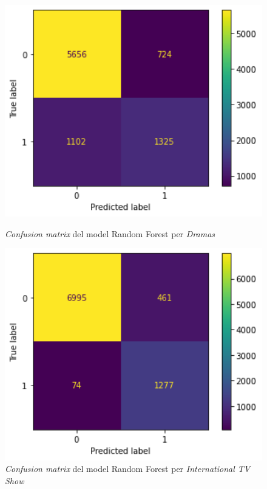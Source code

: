 \documentclass[a4paper, 11pt]{article}
\begin{document}
\begin{figure}[h] %
\begin{minipage}{5cm} %
\begin{center}
    \includegraphics[width=1\textwidth]{ConfMatrix/CM_RF_Dramas.png}
    \caption{\textit{Confusion matrix} del model Random Forest per \textit{Dramas}}
    \includegraphics[width=1\textwidth]{ConfMatrix/CM_RF_InternationalTV.png}
    \caption{\textit{Confusion matrix} del model Random Forest per \textit{International TV Show}}

\end{center}
\end{minipage}
\end{figure}
\end{document}
